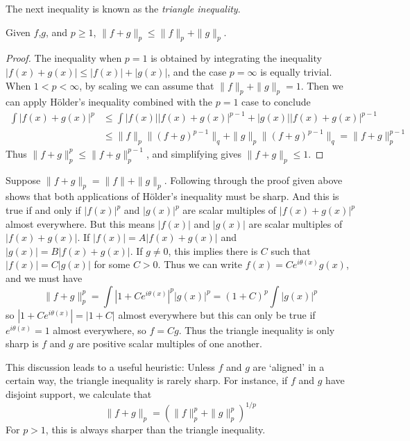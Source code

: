 The next inequality is known as the \emph{triangle inequality}.

\begin{corollary}
  Given $f$,$g$, and $p \geq 1$, $\| f + g \|_p \leq \| f \|_p + \| g \|_p$.
\end{corollary}
\begin{proof}
  The inequality when $p = 1$ is obtained by integrating the inequality $|f(x) + g(x)| \leq |f(x)| + |g(x)|$, and the case $p = \infty$ is equally trivial. When $1 < p < \infty$, by scaling we can assume that $\| f \|_p + \| g \|_p = 1$. Then we can apply H\"{o}lder's inequality combined with the $p = 1$ case to conclude
  \begin{align*}
    \int |f(x) + g(x)|^p &\leq \int |f(x)| |f(x) + g(x)|^{p-1} + |g(x)| |f(x) + g(x)|^{p-1}\\
    &\leq \| f \|_p \| (f + g)^{p-1} \|_q + \| g \|_p \| (f + g)^{p-1} \|_q = \| f + g \|_{p}^{p-1}
  \end{align*}
  Thus $\| f + g \|_p^p \leq \| f + g \|_p^{p-1}$, and simplifying gives $\| f + g \|_p \leq 1$.
\end{proof}

\begin{remark}
  Suppose $\| f + g \|_p = \| f \| + \| g \|_p$. Following through the proof given above shows that both applications of H\"{o}lder's inequality must be sharp. And this is true if and only if $|f(x)|^p$ and $|g(x)|^p$ are scalar multiples of $|f(x) + g(x)|^p$ almost everywhere. But this means $|f(x)|$ and $|g(x)|$ are scalar multiples of $|f(x) + g(x)|$. If $|f(x)| = A|f(x) + g(x)|$ and $|g(x)| = B|f(x) + g(x)|$. If $g \neq 0$, this implies there is $C$ such that $|f(x)| = C |g(x)|$ for some $C > 0$. Thus we can write $f(x) = C e^{i \theta(x)} g(x)$, and we must have
  \[ \| f + g \|_p^p = \int |1 + C e^{i \theta(x)}|^p |g(x)|^p = (1 + C)^p \int |g(x)|^p \]
  so $|1 + Ce^{i \theta(x)}| = |1 + C|$ almost everywhere but this can only be true if $e^{i \theta(x)} = 1$ almost everywhere, so $f = C g$. Thus the triangle inequality is only sharp is $f$ and $g$ are positive scalar multiples of one another.
\end{remark}

This discussion leads to a useful heuristic: Unless $f$ and $g$ are `aligned' in a certain way, the triangle inequality is rarely sharp. For instance, if $f$ and $g$ have disjoint support, we calculate that
%
\[ \| f + g \|_p = \left( \| f \|_p^p + \| g \|_p^p \right)^{1/p} \]
%
For $p > 1$, this is always sharper than the triangle inequality.

